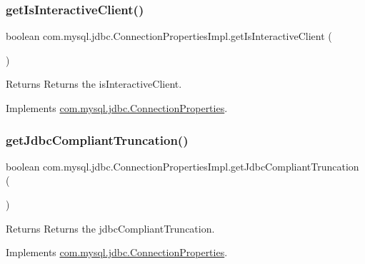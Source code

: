 \subsubsection{\texorpdfstring{get\+Is\+Interactive\+Client()}{getIsInteractiveClient()}}
{\footnotesize\ttfamily boolean com.\+mysql.\+jdbc.\+Connection\+Properties\+Impl.\+get\+Is\+Interactive\+Client (\begin{DoxyParamCaption}{ }\end{DoxyParamCaption})}

\begin{DoxyReturn}{Returns}
Returns the is\+Interactive\+Client. 
\end{DoxyReturn}


Implements \mbox{\hyperlink{interfacecom_1_1mysql_1_1jdbc_1_1_connection_properties_a691575c40598ee5b000bed491d3ef096}{com.\+mysql.\+jdbc.\+Connection\+Properties}}.

\mbox{\label{classcom_1_1mysql_1_1jdbc_1_1_connection_properties_impl_a13e88a03fe05fb85c155ebc5ed35f1a5}} 
\subsubsection{\texorpdfstring{get\+Jdbc\+Compliant\+Truncation()}{getJdbcCompliantTruncation()}}
{\footnotesize\ttfamily boolean com.\+mysql.\+jdbc.\+Connection\+Properties\+Impl.\+get\+Jdbc\+Compliant\+Truncation (\begin{DoxyParamCaption}{ }\end{DoxyParamCaption})}

\begin{DoxyReturn}{Returns}
Returns the jdbc\+Compliant\+Truncation. 
\end{DoxyReturn}


Implements \mbox{\hyperlink{interfacecom_1_1mysql_1_1jdbc_1_1_connection_properties_a97ae1e1a15afdeb0b6a04efd3d58459e}{com.\+mysql.\+jdbc.\+Connection\+Properties}}.

\mbox{\label{classcom_1_1mysql_1_1jdbc_1_1_connection_properties_impl_a34a794bd635dc127a75c1d1728078553}} 
